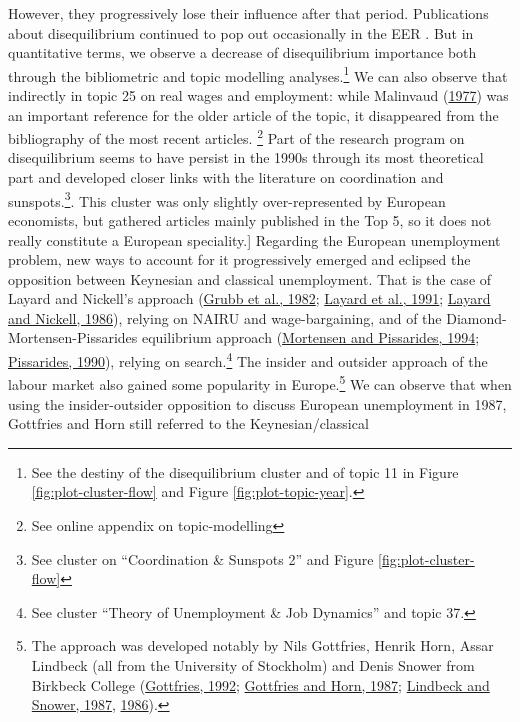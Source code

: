 \documentclass[
  12pt,
  onecolumn]{article}
\begin{document}
However, they progressively lose their influence after that period.
Publications about disequilibrium continued to pop out occasionally in
the EER . But in quantitative terms, we observe a decrease of
disequilibrium importance both through the bibliometric and topic
modelling analyses.\footnote{See the destiny of the disequilibrium
  cluster and of topic 11 in Figure \ref{fig:plot-cluster-flow} and
  Figure \ref{fig:plot-topic-year}.} We can also observe that indirectly
in topic 25 on real wages and employment: while Malinvaud
(\protect\hyperlink{ref-malinvaud1977}{1977}) was an important reference
for the older article of the topic, it disappeared from the bibliography
of the most recent articles. \footnote{See online appendix on
  topic-modelling} Part of the research program on disequilibrium seems
to have persist in the 1990s through its most theoretical part and
developed closer links with the literature on coordination and
sunspots.\footnote{See cluster on ``Coordination \& Sunspots 2'' and
  Figure \ref{fig:plot-cluster-flow}}. This cluster was only slightly
over-represented by European economists, but gathered articles mainly
published in the Top 5, so it does not really constitute a European
speciality.{]} Regarding the European unemployment problem, new ways to
account for it progressively emerged and eclipsed the opposition between
Keynesian and classical unemployment. That is the case of Layard and
Nickell's approach (\protect\hyperlink{ref-grubb1982}{Grubb et al.,
1982}; \protect\hyperlink{ref-layard1991a}{Layard et al., 1991};
\protect\hyperlink{ref-layard1986}{Layard and Nickell, 1986}), relying
on NAIRU and wage-bargaining, and of the Diamond-Mortensen-Pissarides
equilibrium approach (\protect\hyperlink{ref-mortensen1994}{Mortensen
and Pissarides, 1994};
\protect\hyperlink{ref-pissarides1990}{Pissarides, 1990}), relying on
search.\footnote{See cluster ``Theory of Unemployment \& Job Dynamics''
  and topic 37.} The insider and outsider approach of the labour market
also gained some popularity in Europe.\footnote{The approach was
  developed notably by Nils Gottfries, Henrik Horn, Assar Lindbeck (all
  from the University of Stockholm) and Denis Snower from Birkbeck
  College (\protect\hyperlink{ref-gottfries1992}{Gottfries, 1992};
  \protect\hyperlink{ref-gottfries1987}{Gottfries and Horn, 1987};
  \protect\hyperlink{ref-lindbeck1987a}{Lindbeck and Snower, 1987},
  \protect\hyperlink{ref-lindbeck1986}{1986}).} We can observe that when
using the insider-outsider opposition to discuss European unemployment
in 1987, Gottfries and Horn still referred to the Keynesian/classical
\end{document}
